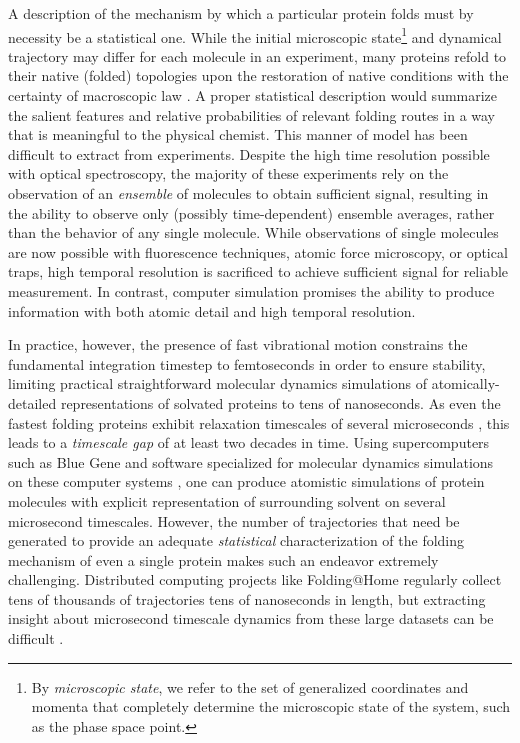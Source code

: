 A description of the mechanism by which a particular protein folds must by necessity be a statistical one.  
While the initial microscopic state\footnote{By \emph{microscopic state}, we refer to the set of generalized coordinates and momenta that completely determine the microscopic state of the system, such as the phase space point.} and dynamical trajectory may differ for each molecule in an experiment, many proteins refold to their native (folded) topologies upon the restoration of native conditions with the certainty of macroscopic law \cite{anfinsen:1973a}.
A proper statistical description would summarize the salient features and relative probabilities of relevant folding routes in a way that is meaningful to the physical chemist.
This manner of model has been difficult to extract from experiments.
Despite the high time resolution possible with optical spectroscopy, the majority of these experiments rely on the observation of an \emph{ensemble} of molecules to obtain sufficient signal, resulting in the ability to observe only (possibly time-dependent) ensemble averages, rather than the behavior of any single molecule.
While observations of single molecules are now possible with fluorescence techniques, atomic force microscopy, or optical traps, high temporal resolution is sacrificed to achieve sufficient signal for reliable measurement.  
In contrast, computer simulation promises the ability to produce information with both atomic detail and high temporal resolution.

In practice, however, the presence of fast vibrational motion constrains the fundamental integration timestep to femtoseconds in order to ensure stability, limiting practical straightforward molecular dynamics simulations of atomically-detailed representations of solvated proteins to tens of nanoseconds.
As even the fastest folding proteins exhibit relaxation timescales of several microseconds \cite{kubelka:2004a}, this leads to a \emph{timescale gap} of at least two decades in time.
Using supercomputers such as Blue Gene \cite{gara:2005a} and software specialized for molecular dynamics simulations on these computer systems \cite{fitch:2003a,germain:2005a}, one can produce atomistic simulations of protein molecules with explicit representation of surrounding solvent on several microsecond timescales.
However, the number of trajectories that need be generated to provide an adequate \emph{statistical} characterization of the folding mechanism of even a single protein makes such an endeavor extremely challenging.  
Distributed computing projects like Folding@Home \cite{pande:2003a} regularly collect tens of thousands of trajectories tens of nanoseconds in length, but extracting insight about microsecond timescale dynamics from these large datasets can be difficult \cite{fersht:2002a,paci:2003a,marianayagam:2005a}.

